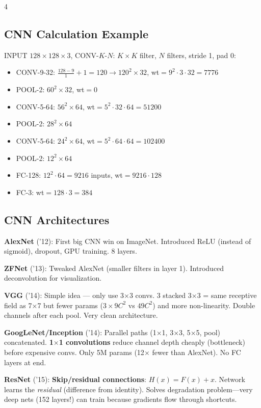 \documentclass[6pt,landscape,a4paper]{extarticle}
\begin{document}
\begin{multicols}{4}
\subsection{CNN Calculation Example}
INPUT $128\!\times\!128\!\times\!3$, CONV-$K$-$N$: $K\!\times\!K$ filter, $N$ filters, stride 1, pad 0:
\begin{itemize}[nosep,leftmargin=*]
\item CONV-9-32: $\frac{128-9}{1}\!+\!1\!=\!120 \to 120^2\!\times\!32$, wt$=9^2\!\cdot\!3\!\cdot\!32\!=\!7776$
\item POOL-2: $60^2\!\times\!32$, wt$=0$
\item CONV-5-64: $56^2\!\times\!64$, wt$=5^2\!\cdot\!32\!\cdot\!64\!=\!51200$
\item POOL-2: $28^2\!\times\!64$
\item CONV-5-64: $24^2\!\times\!64$, wt$=5^2\!\cdot\!64\!\cdot\!64\!=\!102400$
\item POOL-2: $12^2\!\times\!64$
\item FC-128: $12^2\!\cdot\!64\!=\!9216$ inputs, wt$=9216\!\cdot\!128$
\item FC-3: wt$=128\!\cdot\!3\!=\!384$
\end{itemize}

\subsection{CNN Architectures}
\textbf{AlexNet} ('12): First big CNN win on ImageNet. Introduced ReLU (instead of sigmoid), dropout, GPU training. 8 layers.

\textbf{ZFNet} ('13): Tweaked AlexNet (smaller filters in layer 1). Introduced deconvolution for visualization.

\textbf{VGG} ('14): Simple idea --- only use 3$\times$3 convs. 3 stacked 3$\times$3 = same receptive field as 7$\times$7 but fewer params ($3 \times 9C^2$ vs $49C^2$) and more non-linearity. Double channels after each pool. Very clean architecture.

\textbf{GoogLeNet/Inception} ('14): Parallel paths (1$\times$1, 3$\times$3, 5$\times$5, pool) concatenated. \textbf{1$\times$1 convolutions} reduce channel depth cheaply (bottleneck) before expensive convs. Only 5M params (12$\times$ fewer than AlexNet). No FC layers at end.

\textbf{ResNet} ('15): \textbf{Skip/residual connections}: $H(x) = F(x) + x$. Network learns the \textit{residual} (difference from identity). Solves degradation problem---very deep nets (152 layers!) can train because gradients flow through shortcuts.


\end{multicols}
\end{document}
